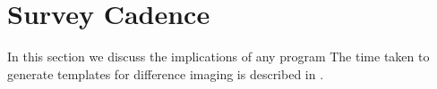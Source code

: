 \section{Survey Cadence}
In this section we discuss the implications of any \es program 
The time taken to generate templates for difference imaging is described in \cite{SMTN-015}.